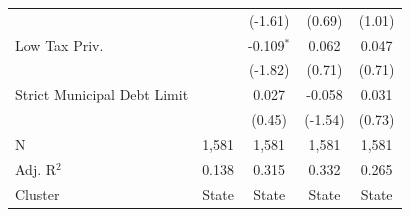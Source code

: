 \begin{tabular*}{\textwidth}{@{\extracolsep{\fill}}lcccc}
                               &               & (-1.61)       & (0.69)       & (1.01)\\   
   Low Tax Priv.               &               & -0.109$^{*}$   & 0.062         & 0.047\\   
                               &               & (-1.82)       & (0.71)       & (0.71)\\   
   Strict Municipal Debt Limit &               & 0.027          & -0.058        & 0.031\\   
                               &               & (0.45)        & (-1.54)      & (0.73)\\   
   \hline
   N                & 1,581         & 1,581          & 1,581         & 1,581\\  
   Adj. R$^2$              & 0.138         & 0.315          & 0.332         & 0.265\\  
   Cluster              & State & State & State & State\\  
   \bottomrule
\end{tabular*}
\par\endgroup
